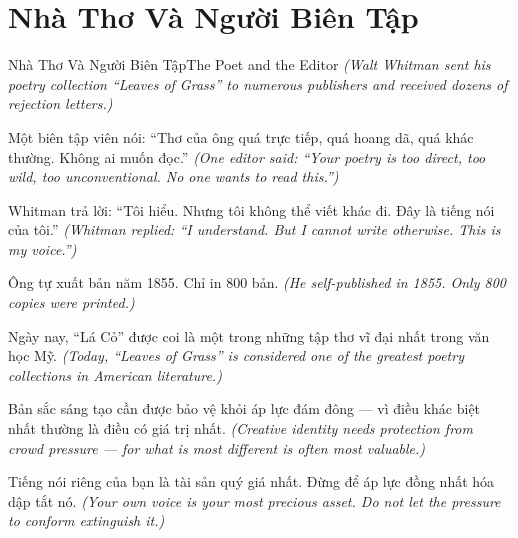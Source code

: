 \section{Nhà Thơ Và Người Biên Tập}
\begin{truyen}{Nhà Thơ Và Người Biên Tập}{The Poet and the Editor}
\textit{(Walt Whitman sent his poetry collection ``Leaves of Grass'' to numerous publishers and received dozens of rejection letters.)}

Một biên tập viên nói: ``Thơ của ông quá trực tiếp, quá hoang dã, quá khác thường. Không ai muốn đọc.''
\textit{(One editor said: ``Your poetry is too direct, too wild, too unconventional. No one wants to read this.'')}

Whitman trả lời: ``Tôi hiểu. Nhưng tôi không thể viết khác đi. Đây là tiếng nói của tôi.''
\textit{(Whitman replied: ``I understand. But I cannot write otherwise. This is my voice.'')}

Ông tự xuất bản năm 1855. Chỉ in 800 bản.
\textit{(He self-published in 1855. Only 800 copies were printed.)}

Ngày nay, ``Lá Cỏ'' được coi là một trong những tập thơ vĩ đại nhất trong văn học Mỹ.
\textit{(Today, ``Leaves of Grass'' is considered one of the greatest poetry collections in American literature.)}

Bản sắc sáng tạo cần được bảo vệ khỏi áp lực đám đông — vì điều khác biệt nhất thường là điều có giá trị nhất.
\textit{(Creative identity needs protection from crowd pressure — for what is most different is often most valuable.)}

\end{truyen}

\begin{baihoc}
Tiếng nói riêng của bạn là tài sản quý giá nhất. Đừng để áp lực đồng nhất hóa dập tắt nó.
\textit{(Your own voice is your most precious asset. Do not let the pressure to conform extinguish it.)}
\end{baihoc}
\ngancach

